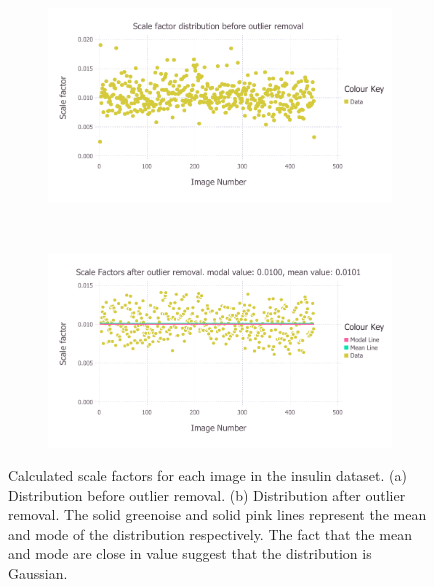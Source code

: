 \begin{figure}
    \centering
    \begin{subfigure}[b]{1.0\textwidth}
            \centering
            \includegraphics[width=\textwidth]{figures/datared/ScaleFac_Plot_Before_outlier_removal.pdf}
            \caption{}
            \label{fig:Scale factors per image before outlier removal - insulin}
    \end{subfigure}
    \\
    \begin{subfigure}[b]{1.0\textwidth}
            \centering
            \includegraphics[width=\textwidth]{figures/datared/ScaleFac_Plot_After_outlier_removal.pdf}
            \caption{}
            \label{fig:Scale factors per image after outlier removal - insulin}
    \end{subfigure}
    \caption[Calculated scale factors for each image in the insulin dataset.]{Calculated scale factors for each image in the insulin dataset.
    (a) Distribution before outlier removal.
    (b) Distribution after outlier removal.
    The solid greenoise and solid pink lines represent the mean and mode of the distribution respectively.
    The fact that the mean and mode are close in value suggest that the distribution is Gaussian.}
    \label{fig:Scale factors per image - insulin}
\end{figure}

